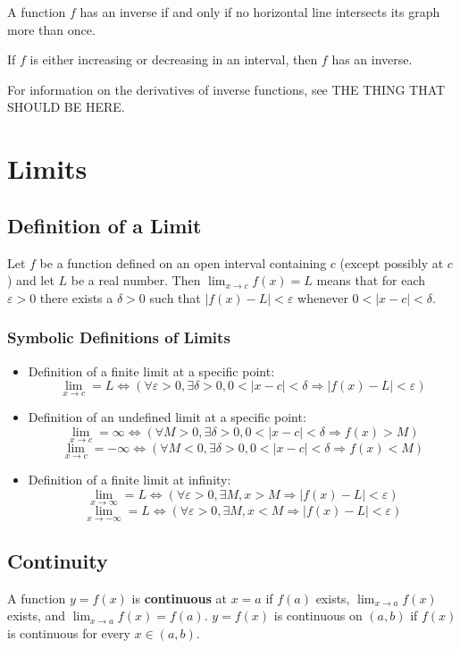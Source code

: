 \documentclass{artikel3}
\begin{document}
A function $f$ has an inverse if and only if no horizontal line intersects its graph more than once.

If $f$ is either increasing or decreasing in an interval, then $f$ has an inverse.

For information on the derivatives of inverse functions, see THE THING THAT SHOULD BE HERE.

\section{Limits}

\subsection{Definition of a Limit}
Let $f$ be a function defined on an open interval containing $c$ 
(except possibly at $c$) and let $L$ be a real number.
Then $\lim_{x \to c} f(x)=L$ means that for each $\varepsilon >0$
there exists a $\delta >0$ such that $|f(x)-L|<\varepsilon$ whenever
$0<|x-c|<\delta$.

\subsubsection{Symbolic Definitions of Limits}
\begin{itemize}
\item{Definition of a finite limit at a specific point:
\[ \lim_{x \to c}=L\Leftrightarrow (\forall\varepsilon >0, \exists\delta >0, 
0<|x-c|<\delta \Rightarrow |f(x)-L|<\varepsilon)\]}
\item{Definition of an undefined limit at a specific point:
\[ \lim_{x \to c}=\infty\Leftrightarrow (\forall M>0, \exists\delta >0,
0<|x-c|<\delta\Rightarrow f(x)>M)\]
\[ \lim_{x \to c}=-\infty\Leftrightarrow (\forall M<0, \exists\delta >0,
0<|x-c|<\delta\Rightarrow f(x)<M)\]}
\item{Definition of a finite limit at infinity:
\[ \lim_{x \to \infty}=L\Leftrightarrow (\forall\varepsilon>0,\exists M,
x>M\Rightarrow|f(x)-L|<\varepsilon) \]
\[ \lim_{x \to -\infty}=L\Leftrightarrow (\forall\varepsilon>0,\exists M,
x<M\Rightarrow|f(x)-L|<\varepsilon) \]}
\end{itemize}

\subsection{Continuity}
A function $y=f(x)$ is \textbf{continuous} at $x=a$ if $f(a)$ exists, 
$\displaystyle\lim_{x \to a}f(x)$ exists, and $\displaystyle\lim_{x \to a}f(x)=f(a)$.
$y=f(x)$ is continuous on $(a,b)$ if $f(x)$ is continuous for every
$x\in(a,b)$.
\end{document}
